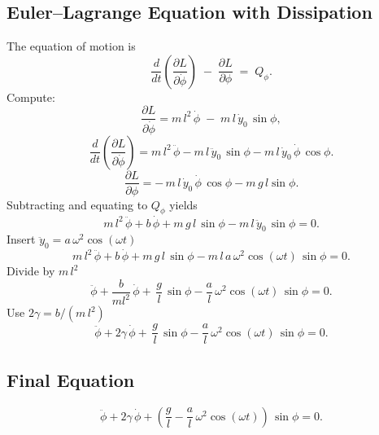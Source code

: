 \documentclass[12pt, letterpaper]{article}
\begin{document}

\subsection{Euler–Lagrange Equation with Dissipation}

The equation of motion is
$$
\frac{d}{dt}\left(\frac{\partial L}{\partial\dot\phi}\right)
\;-\;\frac{\partial L}{\partial\phi}
\;=\;Q_\phi.
$$
Compute:  
   $$
     \frac{\partial L}{\partial\dot\phi}
     = m\,l^2\,\dot\phi \;-\; m\,l\,\dot y_0\,\sin\phi,
   $$
   $$
     \frac{d}{dt}\left(\frac{\partial L}{\partial\dot\phi}\right)
     = m\,l^2\,\ddot\phi
       - m\,l\,\ddot y_0\,\sin\phi
       - m\,l\,\dot y_0\,\dot\phi\,\cos\phi.
   $$
   $$
     \frac{\partial L}{\partial\phi}
     = -\,m\,l\,\dot y_0\,\dot\phi\,\cos\phi
       - m\,g\,l\sin\phi.
   $$
Subtracting and equating to $Q_\phi$ yields
$$
m\,l^2\,\ddot\phi + b\,\dot\phi + m\,g\,l\,\sin\phi
- m\,l\,\ddot y_0\,\sin\phi = 0.
$$
Insert $\ddot y_0 = a\,\omega^2\cos(\omega t)$
$$
m\,l^2\,\ddot\phi + b\,\dot\phi + m\,g\,l\,\sin\phi
- m\,l\,a\,\omega^2\cos(\omega t)\,\sin\phi = 0.
$$
Divide by $m\,l^2$
$$
\ddot\phi + \dfrac{b}{ml^2}\,\dot\phi + \,\dfrac{g}{l}\,\sin\phi
- \dfrac{a}{l}\,\omega^2\cos(\omega t)\,\sin\phi = 0.
$$
Use $2\gamma=b/(m\,l^2)$
$$
\ddot\phi + 2\gamma\,\dot\phi + \,\dfrac{g}{l}\,\sin\phi
- \dfrac{a}{l}\,\omega^2\cos(\omega t)\,\sin\phi = 0.
$$


\subsection{Final Equation}

$$
\boxed{
\ddot\phi + 2\gamma\,\dot\phi
+ \left(\frac{g}{l} - \frac{a}{l}\,\omega^2\cos(\omega t)\right)\,\sin\phi
= 0.
}
$$
\end{document}
